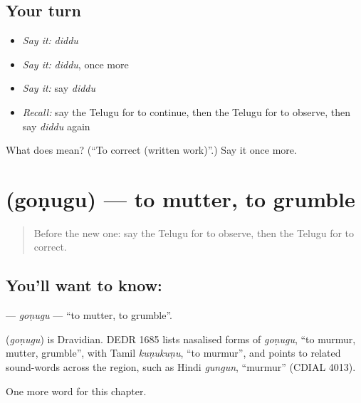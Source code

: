 \subsection*{Your turn}
\begin{itemize}
\raggedright
  \item \emph{Say it:} \emph{diddu}
  \item \emph{Say it:} \emph{diddu}, once more
  \item \emph{Say it:} say \emph{diddu}
  \item \emph{Recall:} say the Telugu for to continue, then the Telugu for to observe, then say \emph{diddu} again
\end{itemize}

\begin{tcolorbox}[breakable,colback=teal!4,colframe=teal!35!black,title={Before you move on}]
What does  mean? (\textquotedblleft{}To correct (written work)\textquotedblright{}.) Say it once more.
\end{tcolorbox}
\section[\texorpdfstring{\te{గొణుగు} (goṇugu)}{గొణుగు (goṇugu)}]{ (goṇugu) — to mutter, to grumble}

\label{lesson:TE-C166-gonugu}



\begin{quote}
Before the new one: say the Telugu for to observe, then the Telugu for to correct.
\end{quote}

\subsection*{You'll want to know: }
\textbf{} — \emph{goṇugu} — \textquotedblleft{}to mutter, to grumble\textquotedblright{}.

\begin{cousinweb}
\textbf{} (\emph{goṇugu}) is Dravidian. DEDR 1685 lists nasalised forms of \emph{goṇugu}, \textquotedblleft{}to murmur, mutter, grumble\textquotedblright{}, with Tamil \emph{kuṇukuṇu}, \textquotedblleft{}to murmur\textquotedblright{}, and points to related sound-words across the region, such as Hindi \emph{gungun}, \textquotedblleft{}murmur\textquotedblright{} (CDIAL 4013).
\end{cousinweb}

\begin{grammarlens}[title={What you've built}]
One more word for this chapter.
\end{grammarlens}

